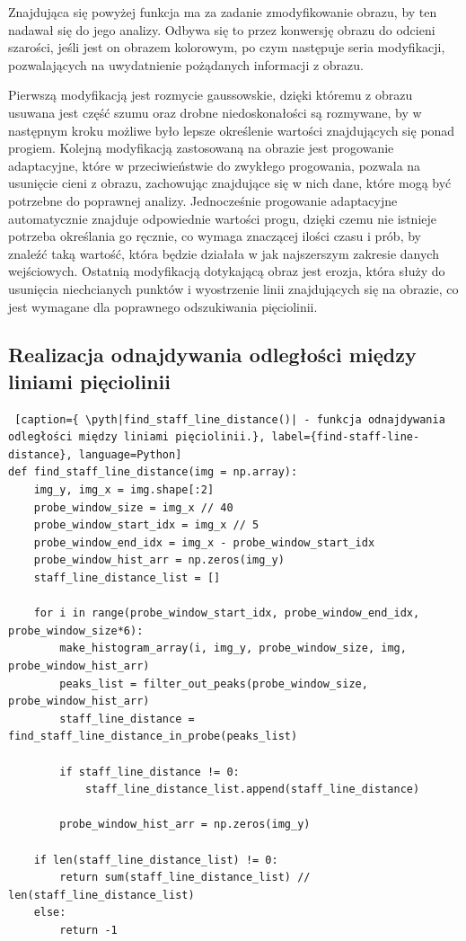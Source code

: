 Znajdująca się powyżej funkcja ma za zadanie zmodyfikowanie obrazu, by ten nadawał się do jego analizy. Odbywa się to przez konwersję obrazu do odcieni szarości, jeśli jest on obrazem kolorowym, po czym następuje seria modyfikacji, pozwalających na uwydatnienie pożądanych informacji z obrazu.

Pierwszą modyfikacją jest rozmycie gaussowskie, dzięki któremu z obrazu usuwana jest część szumu oraz drobne niedoskonałości są rozmywane, by w następnym kroku możliwe było lepsze określenie wartości znajdujących się ponad progiem. Kolejną modyfikacją zastosowaną na obrazie jest progowanie adaptacyjne, które w przeciwieństwie do zwykłego progowania, pozwala na usunięcie cieni z obrazu, zachowując znajdujące się w nich dane, które mogą być potrzebne do poprawnej analizy. Jednocześnie progowanie adaptacyjne automatycznie znajduje odpowiednie wartości progu, dzięki czemu nie istnieje potrzeba określania go ręcznie, co wymaga znaczącej ilości czasu i prób, by znaleźć taką wartość, która będzie działała w jak najszerszym zakresie danych wejściowych. Ostatnią modyfikacją dotykającą obraz jest erozja, która służy do usunięcia niechcianych punktów i wyostrzenie linii znajdujących się na obrazie, co jest wymagane dla poprawnego odszukiwania pięciolinii.



\subsection{Realizacja odnajdywania odległości między liniami pięciolinii} \label{find_staff_line_distance_impl}

\begin{lstlisting} [caption={ \pyth|find_staff_line_distance()| - funkcja odnajdywania odległości między liniami pięciolinii.}, label={find-staff-line-distance}, language=Python]
def find_staff_line_distance(img = np.array):
	img_y, img_x = img.shape[:2]
	probe_window_size = img_x // 40
	probe_window_start_idx = img_x // 5
	probe_window_end_idx = img_x - probe_window_start_idx
	probe_window_hist_arr = np.zeros(img_y)
	staff_line_distance_list = []
	
	for i in range(probe_window_start_idx, probe_window_end_idx, probe_window_size*6):
		make_histogram_array(i, img_y, probe_window_size, img, probe_window_hist_arr)
		peaks_list = filter_out_peaks(probe_window_size, probe_window_hist_arr)
		staff_line_distance = find_staff_line_distance_in_probe(peaks_list)
		
		if staff_line_distance != 0:
			staff_line_distance_list.append(staff_line_distance)
		
		probe_window_hist_arr = np.zeros(img_y)
	
	if len(staff_line_distance_list) != 0:
		return sum(staff_line_distance_list) // len(staff_line_distance_list)
	else:
		return -1
\end{lstlisting}

